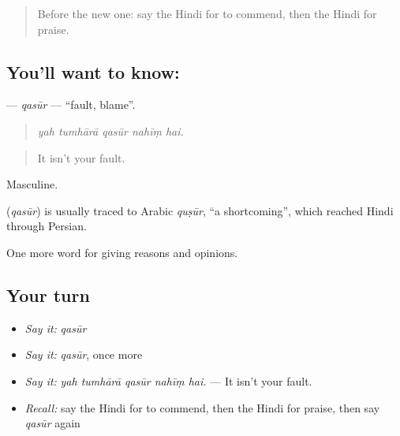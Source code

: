 \label{lesson:HI-C367-qasur}



\begin{quote}
Before the new one: say the Hindi for to commend, then the Hindi for praise.
\end{quote}

\subsection*{You'll want to know: }
\textbf{} — \emph{qasūr} — \textquotedblleft{}fault, blame\textquotedblright{}.

\begin{quote}
    
\end{quote}

\begin{quote}
\emph{yah tumhārā qasūr nahīṃ hai.}
\end{quote}

\begin{quote}
It isn't your fault.
\end{quote}

Masculine.

\begin{cousinweb}
\textbf{} (\emph{qasūr}) is usually traced to Arabic \emph{quṣūr}, \textquotedblleft{}a shortcoming\textquotedblright{}, which reached Hindi through Persian.
\end{cousinweb}

\begin{grammarlens}[title={What you've built}]
One more word for giving reasons and opinions.
\end{grammarlens}

\subsection*{Your turn}
\begin{itemize}
\raggedright
  \item \emph{Say it:} \emph{qasūr}
  \item \emph{Say it:} \emph{qasūr}, once more
  \item \emph{Say it:} \emph{yah tumhārā qasūr nahīṃ hai.} — It isn't your fault.
  \item \emph{Recall:} say the Hindi for to commend, then the Hindi for praise, then say \emph{qasūr} again
\end{itemize}

